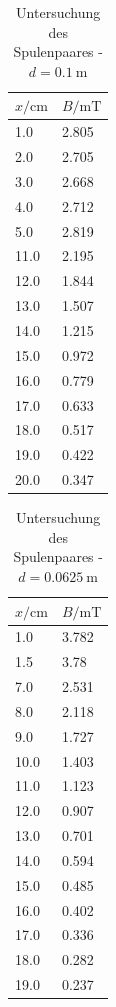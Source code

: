 \documentclass[11pt,ngerman,a4paper]{article}
\begin{document}
\begin{table}[H]
\centering
\begin{tabular}{ll}
\toprule
{$x / \si{\centi\meter}$} &{ $B/\si{\milli\tesla}$ }\\
\midrule
1.0 & 2.805\\
2.0 & 2.705\\
3.0 & 2.668\\
4.0 & 2.712\\
5.0 & 2.819\\
11.0 & 2.195\\
12.0 & 1.844\\
13.0 & 1.507\\
14.0 & 1.215\\
15.0 & 0.972\\
16.0 & 0.779\\
17.0 & 0.633\\
18.0 & 0.517\\
19.0 & 0.422\\
20.0 & 0.347\\
\bottomrule
\end{tabular}
\label{}
\caption{Untersuchung des Spulenpaares - $d =\SI{0.1}{\meter}$}
\end{table}

\begin{table}[H]
\centering
\begin{tabular}{ll}
\toprule
{$x / \si{\centi\meter}$} &{ $B/\si{\milli\tesla}$ }\\
\midrule
1.0 & 3.782\\
1.5 & 3.78\\
7.0 & 2.531\\
8.0 & 2.118\\
9.0 & 1.727\\
10.0 & 1.403\\
11.0 & 1.123\\
12.0 & 0.907\\
13.0 & 0.701\\
14.0 & 0.594\\
15.0 & 0.485\\
16.0 & 0.402\\
17.0 & 0.336\\
18.0 & 0.282\\
19.0 & 0.237\\
\bottomrule
\end{tabular}
\label{}
\caption{Untersuchung des Spulenpaares - $d =\SI{0.0625}{\meter}$}
\end{table}
\end{document}
